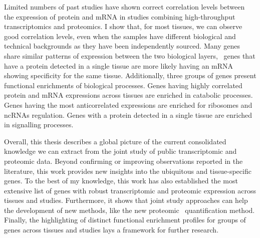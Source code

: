 \begin{singlespace}
{    Limited numbers of past studies have shown correct correlation levels
    between the expression of protein and mRNA
    in studies combining high-throughput transcriptomics and proteomics.
    I show that, for most tissues,
    we can observe good correlation levels,
    even when the samples have different biological and technical backgrounds
    as they have been independently sourced.
    Many genes share similar patterns of expression
    between the two biological layers,
    \eg\ genes that have a protein detected in a single tissue
    are more likely having an mRNA showing specificity for the same tissue.
    Additionally, three groups of genes present functional enrichments
    of biological processes.
    Genes having highly correlated protein and mRNA expressions across tissues
    are enriched in catabolic processes.
    Genes having the most anticorrelated expressions are enriched
    for ribosomes and ncRNAs regulation.
    Genes with a protein detected in a single tissue are enriched
    in signalling processes.\mybr\

    Overall, this thesis describes a global picture
    of the current consolidated knowledge
    we can extract from the joint study
    of public transcriptomic and proteomic data.
    Beyond confirming or improving observations reported in the literature,
    this work provides new insights
    into the ubiquitous and tissue-specific genes.
    To the best of my knowledge,
    this work has also established the most extensive list of genes
    with robust transcriptomic and proteomic expression across tissues and studies.
    Furthermore, it shows that joint study approaches can help the development
    of new methods, like the new proteomic \PPKM\ quantification method.
    Finally, the highlighting of distinct functional enrichment profiles
    for groups of genes across tissues and studies
    lays a framework for further research.\mybr\
    }
\end{singlespace}

